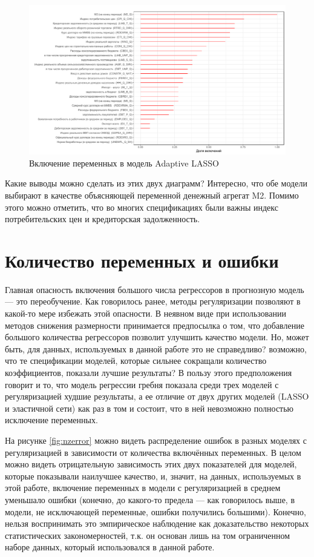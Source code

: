 \begin{figure}[hp]
    \centering
    \includegraphics[width = \textwidth]{nzlollipop1.pdf}
    \caption{Включение переменных в модель Adaptive LASSO}
    \label{fig:lp1}
\end{figure}



Какие выводы можно сделать из этих двух диаграмм? Интересно, что обе модели выбирают в качестве объясняющей переменной денежный агрегат M2. Помимо этого можно отметить, что во многих спецификациях были важны индекс потребительских цен и кредиторская задолженность.



\section{Количество переменных и ошибки}

Главная опасность включения большого числа регрессоров в прогнозную модель --- это переобучение. Как говорилось ранее, методы регуляризации позволяют в какой-то мере избежать этой опасности. В неявном виде при использовании методов снижения размерности принимается предпосылка о том, что добавление большого количества регрессоров позволит улучшить качество модели. Но, может быть, для данных, используемых в данной работе это не справедливо? возможно, что те спецификации моделей, которые сильнее сокращали количество коэффициентов, показали лучшие результаты? В пользу этого предположения говорит и то, что модель регрессии гребня показала среди трех моделей с регуляризацией худшие результаты, а ее отличие от двух других моделей (LASSO и эластичной сети) как раз в том и состоит, что в ней невозможно полностью исключение переменных.

На рисунке \ref{fig:nzerror} можно видеть распределение ошибок в разных моделях с регуляризацией в зависимости от количества включённых переменных. В целом можно видеть отрицательную зависимость этих двух показателей для моделей, которые показывали наилучшее качество, и, значит, на данных, используемых в этой работе, включение переменных в модели с регуляризацией в среднем уменьшало ошибки (конечно, до какого-то предела --- как говорилось выше, в модели, не исключающей переменные, ошибки получились большими). Конечно, нельзя воспринимать это эмпирическое наблюдение как доказательство некоторых статистических закономерностей, т.к. он основан лишь на том ограниченном наборе данных, который использовался в данной работе.


